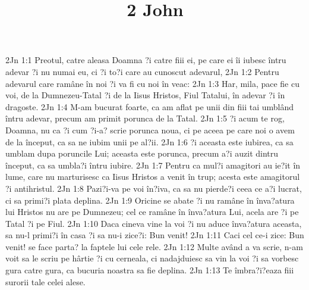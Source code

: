

\title{2 John}

2Jn 1:1  Preotul, catre aleasa Doamna ?i catre fiii ei, pe care ei îi iubesc întru adevar ?i nu numai eu, ci ?i to?i care au cunoscut adevarul,
2Jn 1:2  Pentru adevarul care ramâne în noi ?i va fi cu noi în veac:
2Jn 1:3  Har, mila, pace fie cu voi, de la Dumnezeu-Tatal ?i de la Iisus Hristos, Fiul Tatalui, în adevar ?i în dragoste.
2Jn 1:4  M-am bucurat foarte, ca am aflat pe unii din fiii tai umblând întru adevar, precum am primit porunca de la Tatal.
2Jn 1:5  ?i acum te rog, Doamna, nu ca ?i cum ?i-a? scrie porunca noua, ci pe aceea pe care noi o avem de la început, ca sa ne iubim unii pe al?ii.
2Jn 1:6  ?i aceasta este iubirea, ca sa umblam dupa poruncile Lui; aceasta este porunca, precum a?i auzit dintru început, ca sa umbla?i întru iubire.
2Jn 1:7  Pentru ca mul?i amagitori au ie?it în lume, care nu marturisesc ca Iisus Hristos a venit în trup; acesta este amagitorul ?i antihristul.
2Jn 1:8  Pazi?i-va pe voi în?iva, ca sa nu pierde?i ceea ce a?i lucrat, ci sa primi?i plata deplina.
2Jn 1:9  Oricine se abate ?i nu ramâne în înva?atura lui Hristos nu are pe Dumnezeu; cel ce ramâne în înva?atura Lui, acela are ?i pe Tatal ?i pe Fiul.
2Jn 1:10  Daca cineva vine la voi ?i nu aduce înva?atura aceasta, sa nu-l primi?i în casa ?i sa nu-i zice?i: Bun venit!
2Jn 1:11  Caci cel ce-i zice: Bun venit! se face parta? la faptele lui cele rele.
2Jn 1:12  Multe având a va scrie, n-am voit sa le scriu pe hârtie ?i cu cerneala, ci nadajduiesc sa vin la voi ?i sa vorbesc gura catre gura, ca bucuria noastra sa fie deplina.
2Jn 1:13  Te îmbra?i?eaza fiii surorii tale celei alese.


